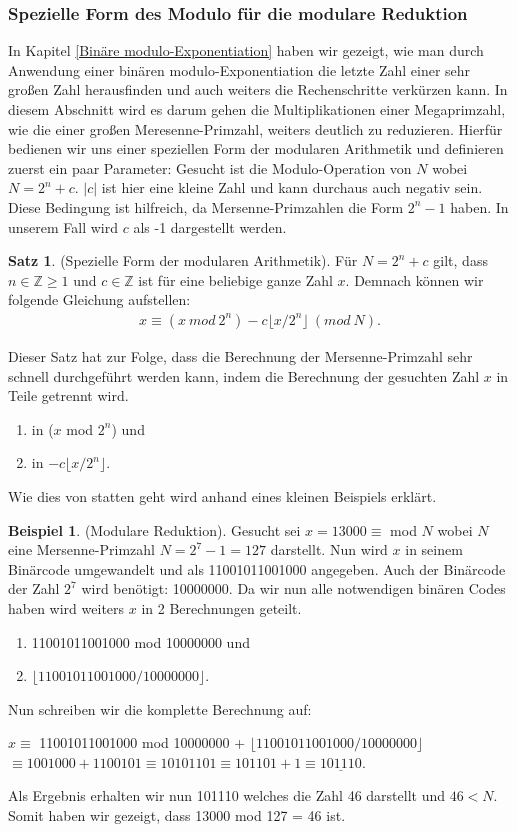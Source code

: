 \documentclass[12pt,a4paper]{article}
\theoremstyle{definition}
\newtheorem{satz}{Satz}[subsection]
\newtheorem{bsp}{Beispiel}[subsection]
\begin{document}
\subsubsection{Spezielle Form des Modulo für die modulare Reduktion}
In Kapitel \ref{Binäre modulo-Exponentiation} haben wir gezeigt, wie man durch Anwendung einer binären modulo-Exponentiation die letzte Zahl einer sehr großen Zahl herausfinden und auch weiters die Rechenschritte verkürzen kann.
In diesem Abschnitt wird es darum gehen die Multiplikationen einer Megaprimzahl, wie die einer großen Meresenne-Primzahl, weiters deutlich zu reduzieren.
Hierfür bedienen wir uns einer speziellen Form der modularen Arithmetik und definieren zuerst ein paar Parameter:\newline
Gesucht ist die Modulo-Operation von $N$ wobei $N = 2^n + c$.\newline
$\vert c \vert$ ist hier eine kleine Zahl und kann durchaus auch negativ sein. Diese Bedingung ist hilfreich, da Mersenne-Primzahlen die Form $2^n-1$ haben.
In unserem Fall wird $c$ als -1 dargestellt werden.
\begin{satz}(Spezielle Form der modularen Arithmetik).\newline
Für $N = 2^n + c$ gilt, dass $n \in \mathbb{Z} \geq 1$ und $c \in \mathbb{Z}$ ist für eine beliebige ganze Zahl $x$.
Demnach können wir folgende Gleichung aufstellen:
\begin{align}
x \equiv (x\ mod\ 2^n) - c \lfloor x/2^n \rfloor\ (mod\ N).
\end{align}
\end{satz}
Dieser Satz hat zur Folge, dass die Berechnung der Mersenne-Primzahl sehr schnell durchgeführt werden kann, indem die Berechnung der gesuchten Zahl $x$ in Teile getrennt wird.
\begin{enumerate}
    \item in ($x$ mod $2^n$) und
    \item in $- c \lfloor x/2^n \rfloor$.
\end{enumerate}
Wie dies von statten geht wird anhand eines kleinen Beispiels erklärt.
\begin{bsp}(Modulare Reduktion).\newline
Gesucht sei $x = 13000 \equiv$ mod $N$ wobei $N$ eine Mersenne-Primzahl $N = 2^7 - 1 =127$ darstellt.
Nun wird $x$ in seinem Binärcode umgewandelt und als 11001011001000 angegeben.
Auch der Binärcode der Zahl $2^7$ wird benötigt: 10000000.
Da wir nun alle notwendigen binären Codes haben wird weiters $x$ in 2 Berechnungen geteilt.
\begin{enumerate}
    \item 11001011001000 mod 10000000 und
    \item $\lfloor11001011001000/10000000\rfloor$.
\end{enumerate}
Nun schreiben wir die komplette Berechnung auf:
\begin{center}
$x \equiv$ 11001011001000 mod 10000000 + $\lfloor11001011001000/10000000\rfloor$ $\equiv 1001000 + 1100101 \equiv 10101101 \equiv 101101 + 1 \equiv \underline{101110}$.
\end{center}
Als Ergebnis erhalten wir nun 101110 welches die Zahl 46 darstellt und $46 < N$.
Somit haben wir gezeigt, dass 13000 mod 127 = 46 ist.
\end{bsp}
\end{document}
